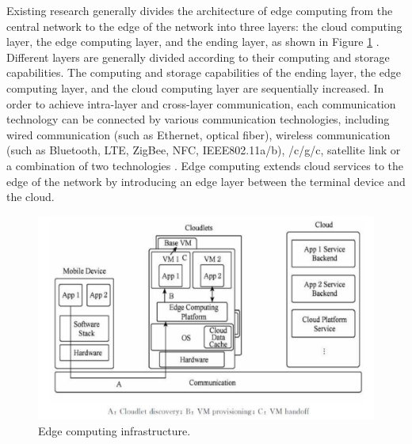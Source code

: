 Existing research generally divides the architecture of edge computing from the central network to the
edge of the network into three layers: the cloud computing layer, the edge computing layer, and the ending
layer, as shown in Figure \ref{fig:edge_infr} \cite{IoT,Edge4,Edge5}. Different layers are generally divided according to their computing
and storage capabilities. The computing and storage capabilities of the ending layer, the edge computing
layer, and the cloud computing layer are sequentially increased. In order to achieve intra-layer and
cross-layer communication, each communication technology can be connected by various communication
technologies, including wired communication (such as Ethernet, optical fiber), wireless communication
(such as Bluetooth, LTE, ZigBee, NFC, IEEE802.11a/b), /c/g/c, satellite link or a combination of two
technologies \cite{Communication}. Edge computing extends cloud services to the edge of the network by introducing an edge
layer between the terminal device and the cloud.

\begin{figure}
        \includegraphics[width=\textwidth]{Images/Edge_infrastructure.png}
        \caption{Edge computing infrastructure.}
        \label{fig:edge_infr}
\end{figure}


